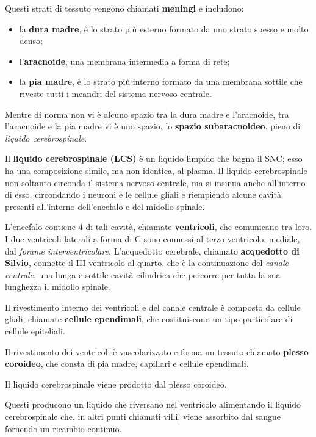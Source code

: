 \documentclass[]{article}
\begin{document}
Questi strati di tessuto vengono chiamati \textbf{meningi} e includono:

\begin{itemize}
\itemsep1pt\parskip0pt
\item
  la \textbf{dura madre}, è lo strato più esterno formato da uno strato
  spesso e molto denso;
\item
  l'\textbf{aracnoide}, una membrana intermedia a forma di rete;
\item
  la \textbf{pia madre}, è lo strato più interno formato da una membrana
  sottile che riveste tutti i meandri del sistema nervoso centrale.
\end{itemize}

Mentre di norma non vi è alcuno spazio tra la dura madre e l'aracnoide,
tra l'aracnoide e la pia madre vi è uno spazio, lo \textbf{spazio
subaracnoideo}, pieno di \emph{liquido cerebrospinale}.

Il \textbf{liquido cerebrospinale (LCS)} è un liquido limpido che bagna
il SNC; esso ha una composizione simile, ma non identica, al plasma. Il
liquido cerebrospinale non soltanto circonda il sistema nervoso
centrale, ma si insinua anche all'interno di esso, circondando i neuroni
e le cellule gliali e riempiendo alcune cavità presenti all'interno
dell'encefalo e del midollo spinale.

L'encefalo contiene 4 di tali cavità, chiamate \textbf{ventricoli}, che
comunicano tra loro. I due ventricoli laterali a forma di C sono
connessi al terzo ventricolo, mediale, dal \emph{forame
interventricolare}. L'acquedotto cerebrale, chiamato \textbf{acquedotto
di Silvio}, connette il III ventricolo al quarto, che è la continuazione
del \emph{canale centrale}, una lunga e sottile cavità cilindrica che
percorre per tutta la sua lunghezza il midollo spinale.

Il rivestimento interno dei ventricoli e del canale centrale è composto
da cellule gliali, chiamate \textbf{cellule ependimali}, che
costituiscono un tipo particolare di cellule epiteliali.

Il rivestimento dei ventricoli è vascolarizzato e forma un tessuto
chiamato \textbf{plesso coroideo}, che consta di pia madre, capillari e
cellule ependimali.

Il liquido cerebrospinale viene prodotto dal plesso coroideo.

Questi producono un liquido che riversano nel ventricolo alimentando il
liquido cerebrospinale che, in altri punti chiamati villi, viene
assorbito dal sangue fornendo un ricambio continuo.
\end{document}
